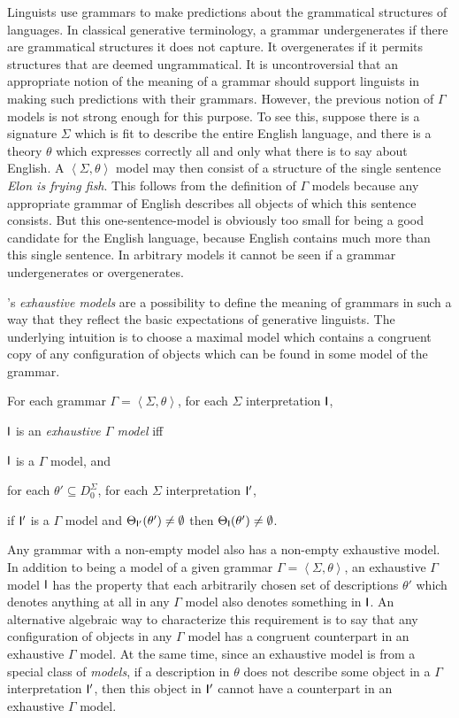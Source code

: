 \documentclass[output=paper
                ,modfonts
                ,nonflat
	        ,collection
	        ,collectionchapter
	        ,collectiontoclongg
 	        ,biblatex
                ,babelshorthands
                ,newtxmath
                ,draftmode
                ,colorlinks, citecolor=brown
]{./langsci/langscibook}
\begin{document}
{{Linguists use grammars to make predictions about the grammatical
structures of languages. In classical generative terminology, a
grammar undergenerates if there are grammatical structures it does not
capture. It overgenerates if it permits structures that are deemed
ungrammatical. It is uncontroversial that an appropriate notion of the
meaning of a grammar should support linguists in making such
predictions with their grammars. However, the previous notion of
$\Gamma$ models is not strong enough for this purpose. To see this,
suppose there is a signature $\Sigma$ which is fit to describe the
entire English language, and there is a theory $\theta$ which
expresses correctly all and only what there is to say about English. A
$\left< \Sigma, \theta \right>$ model may then consist of a structure
of the single sentence \emph{Elon is frying fish}.  This follows from
the definition of $\Gamma$ models because any appropriate grammar of
English describes all objects of which this sentence consists. But
this one-sentence-model is obviously too small for being a good
candidate for the English language, because English contains much more
than this single sentence. In arbitrary models it cannot be seen if
a grammar undergenerates or overgenerates.


\citet{King99a-u}'s \emph{exhaustive models} are a possibility to
define the meaning of grammars in such a way that they reflect the
basic expectations of generative linguists. The underlying intuition
is to choose a maximal model which contains a congruent copy of any
configuration of objects which can be found in some model of the grammar.

\begin{mydef}
For each grammar $\Gamma = \left< \Sigma, \theta \right>$,
for each $\Sigma$ interpretation $\mathsf{I}$,

$\mathsf{I}$ is an \emph{exhaustive $\Gamma$ model} iff

$\mathsf{I}$ is a $\Gamma$ model, and

for each \(\theta' \subseteq D_0^{\Sigma}\),
for each $\Sigma$ interpretation $\mathsf{I}'$,

if $\mathsf{I}'$ is a $\Gamma$ model and \(\Theta_{\mathsf{I}'}(\theta') \not= \emptyset\)
then \(\Theta_{\mathsf{I}}(\theta') \not= \emptyset\).
\end{mydef}

Any grammar with a non-empty model also has a non-empty exhaustive
model.
In addition to being a model of a given grammar $\Gamma = \left<
\Sigma, \theta \right>$, an exhaustive $\Gamma$ model $\mathsf{I}$ has the
property that each arbitrarily chosen set of descriptions $\theta'$
which denotes anything at all in any $\Gamma$ model also denotes
something in $\mathsf{I}$. An alternative algebraic way to characterize
this requirement is to say that any configuration of objects in any
$\Gamma$ model has a congruent counterpart in an exhaustive $\Gamma$
model. At the same time, since an exhaustive model is from a special class
of \emph{models}, if a description in $\theta$ does not describe some object in
a $\Gamma$ interpretation $\mathsf{I}'$, then this object in $\mathsf{I}'$ cannot
have a counterpart in an exhaustive $\Gamma$ model.

}}
\end{document}
